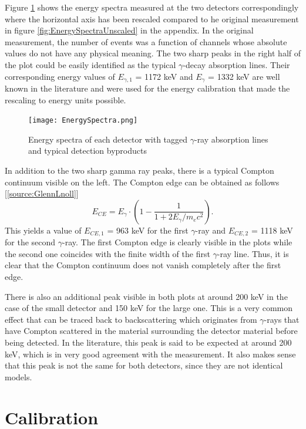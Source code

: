 \documentclass[a4paper,parskip,11pt, DIV12]{scrreprt}
\begin{document}
		Figure \ref{fig:EnergySpectra} shows the energy spectra measured at the two detectors correspondingly where the horizontal axis has been rescaled compared to he original measurement in figure \ref{fig:EnergySpectraUnscaled} in the appendix. In the original measurement, the number of events was a function of channels whose absolute values do not have any physical meaning. The two sharp peaks in the right half of the plot could be easily identified as the typical $\gamma$-decay absorption lines. Their corresponding energy values of $E_{\gamma,1}$ = 1172 keV and $E_{\gamma}$ = 1332 keV are well known in the literature and were used for the energy calibration that made the rescaling to energy units possible.	
		\begin{figure}[H]
\centering
\texttt{[image: EnergySpectra.png]}
\caption[EnergySpectra]{Energy spectra of each detector with tagged $\gamma$-ray absorption lines and typical detection byproducts}
\label{fig:EnergySpectra}
	\end{figure}	
		In addition to the two sharp gamma ray peaks, there is a typical Compton continuum visible on the left. The Compton edge can be obtained as follows [\ref{source:GlennLnoll}]
	\begin{equation}
E_{CE} = E_{\gamma} \cdot \left(1 - \frac{1}{1+2 E_{\gamma}/m_ec^2} \right).
\end{equation}
		This yields a value of $E_{CE,1}$ = 963 keV for the first $\gamma$-ray and $E_{CE,2}$ = 1118 keV for the second $\gamma$-ray. The first Compton edge is clearly visible in the plots while the second one coincides with the finite width of the first $\gamma$-ray line. Thus, it is clear that the Compton continuum does not vanish completely after the first edge.

		There is also an additional peak visible in both plots at around 200 keV in the case of the small detector and 150 keV for the large one. This is a very common effect that can be traced back to backscattering which originates from $\gamma$-rays that have Compton scattered in the material surrounding the detector material before being detected. In the literature, this peak is said to be expected at around 200 keV, which is in very good agreement with the measurement. It also makes sense that this peak is not the same for both detectors, since they are not identical models.


\chapter{Calibration}
\end{document}
